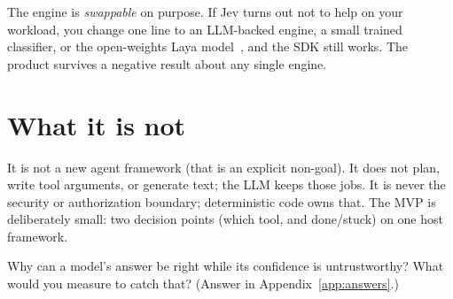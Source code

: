 \begin{whyhere}
The engine is \emph{swappable} on purpose. If Jev turns out not to help on your workload,
you change one line to an LLM-backed engine, a small trained classifier, or the
open-weights Laya model~\citep{laya}, and the SDK still works. The product survives a
negative result about any single engine.
\end{whyhere}

\section{What it is not}

It is not a new agent framework (that is an explicit non-goal). It does not plan, write
tool arguments, or generate text; the LLM keeps those jobs. It is never the security or
authorization boundary; deterministic code owns that. The MVP is deliberately small: two
decision points (which tool, and done/stuck) on one host framework.

\begin{checkbox}
Why can a model's answer be right while its confidence is untrustworthy? What would you
measure to catch that? (Answer in Appendix~\ref{app:answers}.)
\end{checkbox}
